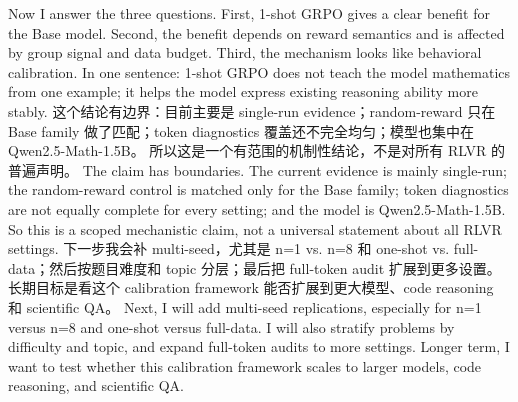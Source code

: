 {}\markdownRendererInterblockSeparator
{}Now I answer the three questions. First, 1-shot GRPO gives a clear benefit for the Base model. Second, the benefit depends on reward semantics and is affected by group signal and data budget. Third, the mechanism looks like behavioral calibration.\markdownRendererInterblockSeparator
{}In one sentence: 1-shot GRPO does not teach the model mathematics from one example; it helps the model express existing reasoning ability more stably.\markdownRendererInterblockSeparator
{}\markdownRendererHorizontalRule{}\markdownRendererInterblockSeparator
{}\markdownRendererInterblockSeparator
{}\markdownRendererInterblockSeparator
{}这个结论有边界：目前主要是 single-run evidence；random-reward 只在 Base family 做了匹配；token diagnostics 覆盖还不完全均匀；模型也集中在 Qwen2.5-Math-1.5B。\markdownRendererInterblockSeparator
{}所以这是一个有范围的机制性结论，不是对所有 RLVR 的普遍声明。\markdownRendererInterblockSeparator
{}\markdownRendererInterblockSeparator
{}The claim has boundaries. The current evidence is mainly single-run; the random-reward control is matched only for the Base family; token diagnostics are not equally complete for every setting; and the model is Qwen2.5-Math-1.5B.\markdownRendererInterblockSeparator
{}So this is a scoped mechanistic claim, not a universal statement about all RLVR settings.\markdownRendererInterblockSeparator
{}\markdownRendererHorizontalRule{}\markdownRendererInterblockSeparator
{}\markdownRendererInterblockSeparator
{}\markdownRendererInterblockSeparator
{}下一步我会补 multi-seed，尤其是 n=1 vs. n=8 和 one-shot vs. full-data；然后按题目难度和 topic 分层；最后把 full-token audit 扩展到更多设置。\markdownRendererInterblockSeparator
{}长期目标是看这个 calibration framework 能否扩展到更大模型、code reasoning 和 scientific QA。\markdownRendererInterblockSeparator
{}\markdownRendererInterblockSeparator
{}Next, I will add multi-seed replications, especially for n=1 versus n=8 and one-shot versus full-data. I will also stratify problems by difficulty and topic, and expand full-token audits to more settings.\markdownRendererInterblockSeparator
{}Longer term, I want to test whether this calibration framework scales to larger models, code reasoning, and scientific QA.\markdownRendererInterblockSeparator
